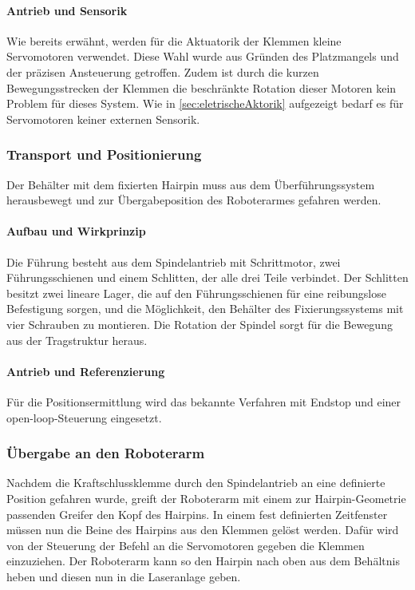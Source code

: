 \paragraph{Antrieb und Sensorik}
Wie bereits erwähnt, werden für die Aktuatorik der Klemmen kleine Servomotoren verwendet. Diese Wahl wurde aus Gründen des Platzmangels
und der präzisen Ansteuerung getroffen. Zudem ist durch die kurzen Bewegungsstrecken der Klemmen die beschränkte Rotation dieser
Motoren kein Problem für dieses System. Wie in \cref{sec:eletrischeAktorik} aufgezeigt bedarf es für Servomotoren keiner externen Sensorik.

\subsubsection{Transport und Positionierung}\label{sec:Transportsystem}
Der Behälter mit dem fixierten Hairpin muss aus dem Überführungssystem herausbewegt und zur Übergabeposition des Roboterarmes
gefahren werden.

\paragraph{Aufbau und Wirkprinzip}
Die Führung besteht aus dem Spindelantrieb mit Schrittmotor, zwei Führungsschienen und einem Schlitten, der alle drei Teile verbindet.
Der Schlitten besitzt zwei lineare Lager, die auf den Führungsschienen für eine reibungslose Befestigung sorgen, und die Möglichkeit,
den Behälter des Fixierungssystems mit vier Schrauben zu montieren. Die Rotation der Spindel sorgt für die Bewegung aus der Tragstruktur
heraus.

\paragraph{Antrieb und Referenzierung}
Für die Positionsermittlung wird das bekannte Verfahren mit Endstop und einer open-loop-Steuerung eingesetzt.

\subsubsection{Übergabe an den Roboterarm}
Nachdem die Kraftschlussklemme durch den Spindelantrieb an eine definierte Position gefahren wurde, greift der Roboterarm mit einem
zur Hairpin-Geometrie passenden Greifer den Kopf des Hairpins. In einem fest definierten Zeitfenster müssen nun die Beine des Hairpins aus den
Klemmen gelöst werden. Dafür wird von der Steuerung der Befehl an die Servomotoren gegeben die Klemmen einzuziehen. Der
Roboterarm kann so den Hairpin nach oben aus dem Behältnis heben und diesen nun in die Laseranlage geben.


